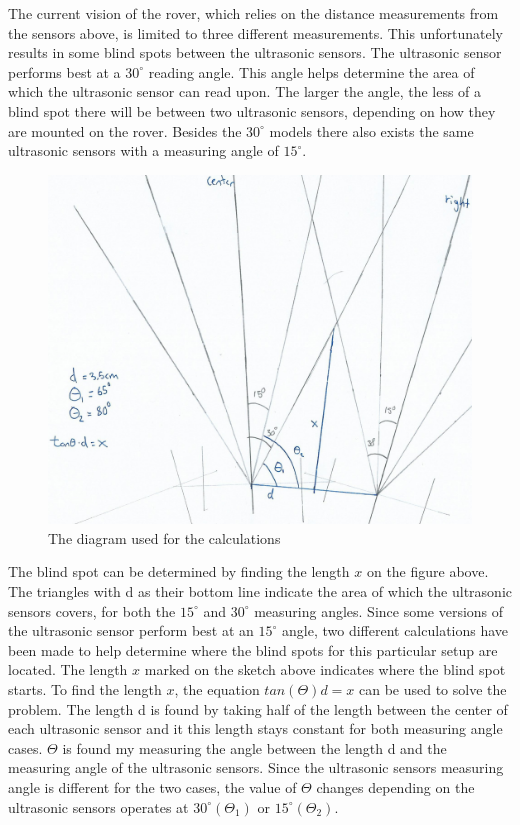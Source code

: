 \begin{figure}[H]
\begin{subfigure}[H]{0.4\textwidth}
		\label{fig:measuringangle}
	\end{subfigure}
\end{figure}

The current vision of the rover, which relies on the distance measurements from the sensors above, is limited to three different measurements. This unfortunately results in some blind spots between the ultrasonic sensors.
The ultrasonic sensor performs best at a $30^\circ$ reading angle. This angle helps determine the area of which the ultrasonic sensor can read upon. The larger the angle, the less of a blind spot there will be between two ultrasonic sensors, depending on how they are mounted on the rover\cite{hcsr40datesheet}. Besides the $30^\circ$ models there also exists the same ultrasonic sensors with a measuring angle of $15^\circ$.

\clearpage
\begin{figure}[H]
	\centering
	\includegraphics[width=0.8\linewidth]{images/blindspot_calc.jpg}
	\caption{The diagram used for the calculations}
	\label{fig:calculationdiagram}
\end{figure}

The blind spot can be determined by finding the length $x$ on the figure above. The triangles with d as their bottom line indicate the area of which the ultrasonic sensors covers, for both the $15^\circ$ and $30^\circ$ measuring angles. Since some versions of the ultrasonic sensor perform best at an $15^\circ$ angle, two different calculations have been made to help determine where the blind spots for this particular setup are located.
The length $x$ marked on the sketch above indicates where the blind spot starts. To find the length $x$, the equation $tan(\Theta)d = x$ can be used to solve the problem. The length d is found by taking half of the length between the center of each ultrasonic sensor and it this length stays constant for both measuring angle cases. $\Theta$ is found my measuring the angle between the length d and the measuring angle of the ultrasonic sensors. Since the ultrasonic sensors measuring angle is different for the two cases, the value of $\Theta$ changes depending on the ultrasonic sensors operates at $30^\circ (\Theta_1)$ or $15^\circ (\Theta_2)$.

